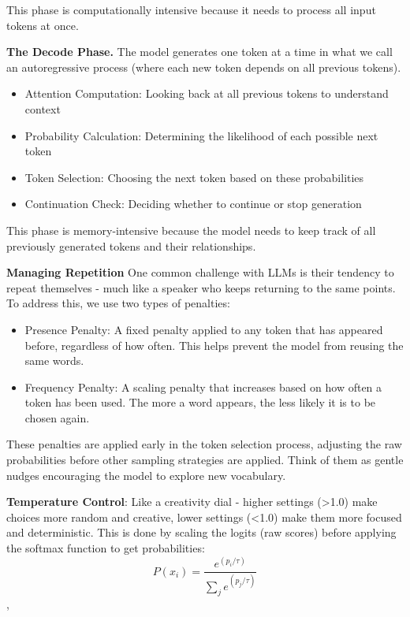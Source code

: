 \documentclass{article}
\begin{document}
This phase is computationally intensive because it needs to process all
input tokens at once.

\textbf{The Decode Phase.} The model generates one token at a time in
what we call an autoregressive process (where each new token depends on
all previous tokens).

\begin{itemize}
\item
  Attention Computation: Looking back at all previous tokens to
  understand context
\item
  Probability Calculation: Determining the likelihood of each possible
  next token
\item
  Token Selection: Choosing the next token based on these probabilities
\item
  Continuation Check: Deciding whether to continue or stop generation
\end{itemize}

This phase is memory-intensive because the model needs to keep track of
all previously generated tokens and their relationships.


\textbf{Managing Repetition} One common challenge with LLMs is their
tendency to repeat themselves - much like a speaker who keeps returning
to the same points. To address this, we use two types of penalties:

\begin{itemize}
\item
  Presence Penalty: A fixed penalty applied to any token that has
  appeared before, regardless of how often. This helps prevent the model
  from reusing the same words.
\item
  Frequency Penalty: A scaling penalty that increases based on how often
  a token has been used. The more a word appears, the less likely it is
  to be chosen again.
\end{itemize}

These penalties are applied early in the token selection process,
adjusting the raw probabilities before other sampling strategies are
applied. Think of them as gentle nudges encouraging the model to explore
new vocabulary.


\textbf{Temperature Control}: Like a creativity dial - higher settings
(\textgreater1.0) make choices more random and creative, lower settings
(\textless1.0) make them more focused and deterministic. This is done by
scaling the logits (raw scores) before applying the softmax function to
get probabilities: 
\[
P(x_i) = \frac{e^{(p_i / \tau)}}{\sum_{j} e^{(p_j / \tau)}}
\],
\end{document}

